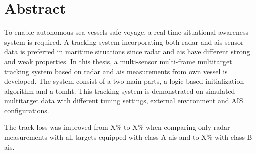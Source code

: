 
\section*{\huge Abstract}
\hfill
\noindent

To enable autonomous sea vessels safe voyage, a real time situational awareness system is required. A tracking system incorporating both radar and \gls{ais} sensor data is preferred in maritime situations since radar and \gls{ais} have different strong and weak properties. In this thesis, a multi-sensor multi-frame multitarget tracking system based on radar and \gls{ais} \glspl{measurement} from own vessel is developed. The system consist of a two main parts, a logic based initialization algorithm and a \gls{tomht}. This tracking system is demonstrated on simulated multitarget data with different tuning settings, external environment and AIS configurations.

The track loss was improved from X\% to X\% when comparing only radar measurements with all targets equipped with class A \gls{ais} and to X\% with class B \gls{ais}.  